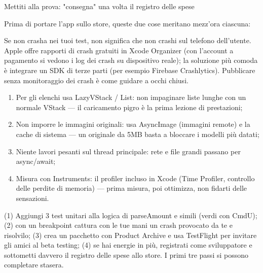 \begin{tcbpractice}{Mettiti alla prova: "consegna" una volta il registro delle spese}

Prima di portare l'app sullo store, queste due cose meritano mezz'ora ciascuna:


Se non crasha nei tuoi test, non significa che non crashi sul telefono dell'utente. Apple offre rapporti di crash gratuiti in Xcode Organizer (con l'account a pagamento si vedono i log dei crash su dispositivo reale); la soluzione più comoda è integrare un SDK di terze parti (per esempio Firebase Crashlytics). Pubblicare senza monitoraggio dei crash è come guidare a occhi chiusi.


\begin{enumerate}
  \item Per gli elenchi usa LazyVStack / List: non impaginare liste lunghe con un normale VStack — il caricamento pigro è la prima lezione di prestazioni;
  \item Non imporre le immagini originali: usa AsyncImage (immagini remote) e la cache di sistema — un originale da 5MB basta a bloccare i modelli più datati;
  \item Niente lavori pesanti sul thread principale: rete e file grandi passano per async/await;
  \item Misura con Instruments: il profiler incluso in Xcode (Time Profiler, controllo delle perdite di memoria) — prima misura, poi ottimizza, non fidarti delle sensazioni.
\end{enumerate}

(1) Aggiungi 3 test unitari alla logica di parseAmount e simili (verdi con CmdU); (2) con un breakpoint cattura con le tue mani un crash provocato da te e risolvilo; (3) crea un pacchetto con Product Archive e usa TestFlight per invitare gli amici al beta testing; (4) se hai energie in più, registrati come sviluppatore e sottometti davvero il registro delle spese allo store. I primi tre passi si possono completare stasera.

\end{tcbpractice}

